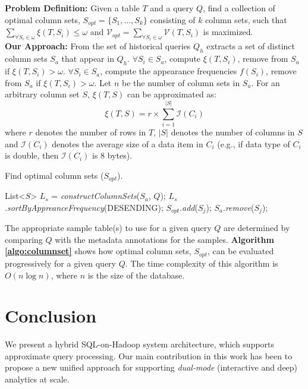 \documentclass{sig-alternate-05-2015}
\begin{document}
\noindent
\textbf{Problem Definition:}  Given a table $T$ and a query $Q$, find a collection of optimal column sets, $S_{opt} = \{S_1, ..., S_k\}$ consisting of $k$ column sets, such that $\sum_{\forall S_i \in \omega} \xi(T, S_i) \leq \omega $ and $\mathcal{V}_{opt} = \sum_{\forall S_i \in \omega} \mathcal{V}(T, S_i) $ is maximized.\\

\noindent
\textbf{Our Approach:}
From the set of historical queries $Q_h$ extracts a set of distinct column sets $S_{a}$ that appear in $Q_h$.
$\forall S_i \in S_{a}$, compute $\xi(T, S_i)$, remove from $S_{a}$ if $\xi(T, S_i) > \omega$.
$\forall S_i \in S_{a}$, compute the appearance frequencies $f(S_i)$, remove from $S_{a}$ if $\xi(T, S_i) > \omega$.
Let $n$ be the number of column sets in $S_a$.
For an arbitrary column set $S$, $\xi(T, S)$ can be approximated as:
\begin{equation}
\xi(T, S) = r \times \sum_{i=1}^{|S|} \mathcal{I}(C_i)
\end{equation}
where $r$ denotes the number of rows in $T$, 
$|S|$ denotes the number of columns in $S$ 
and $\mathcal{I}(C_i)$ denotes the average size of a data item in $C_i$ 
(e.g., if data type of $C_i$ is double, then $\mathcal{I}(C_i)$ is 8 bytes).
\begin{algorithm}
\caption{Find optimal column sets ($S_{opt}$).}
\label{algo:columnset}
\begin{algorithmic}[1]
	\State List<$S$> $L_{s}$ = \textit{constructColumnSets}($S_a$, $Q$);
	\State $L_{s}$.\textit{sortByAppreanceFrequency}(DESENDING);
	\Return
	\Else 	
	\State $S_{opt}$.\textit{add}($S_j$); 
	\State $S_a$.\textit{remove}($S_j$); 
	\EndIf
	\EndFor
	\EndProcedure
\end{algorithmic}
\end{algorithm}

The appropriate sample table(s) to use for a given query $Q$ are determined by comparing $Q$ with the metadata annotations for the samples.  \textbf{Algorithm \ref{algo:columnset}} shows how optimal column sets, $S_{opt}$, can be evaluated progressively for a given query $Q$. The time complexity of this algorithm is $O (n \log n)$, where $n$ is the size of the database.

\section{Conclusion}
We present a hybrid SQL-on-Hadoop system architecture, which supports approximate query processing. 
Our main contribution in this work has been to propose a new unified approach for supporting \textit{dual-mode} (interactive and deep) analytics at scale.
\end{document}
